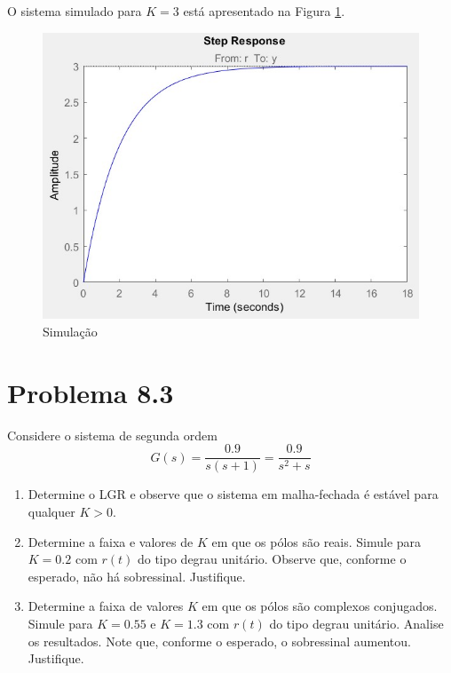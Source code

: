 \documentclass[
]{book}
\providecommand{\tightlist}{%
  \setlength{\itemsep}{0pt}\setlength{\parskip}{0pt}}
\theoremstyle{definition}
\theoremstyle{definition}
\theoremstyle{definition}
\theoremstyle{remark}
\begin{document}
O sistema simulado para \(K = 3\) está apresentado na Figura \ref{fig:fig82b2}.

\begin{figure}

{\centering \includegraphics{Imagens/Lab8/Resolução/fig2b2} 

}

\caption{Simulação}\label{fig:fig82b2}
\end{figure}

\hypertarget{problema-8.3}{%
\section*{Problema 8.3}\label{problema-8.3}}

Considere o sistema de segunda ordem
\[
G(s) = \frac{0.9}{s(s+1)} = \frac{0.9}{s^2+s}
\]

\begin{enumerate}
\def\labelenumi{\alph{enumi}.}
\tightlist
\item
  Determine o LGR e observe que o sistema em malha-fechada é estável para qualquer \(K>0\).
\item
  Determine a faixa e valores de \(K\) em que os pólos são reais. Simule para \(K=0.2\) com \(r(t)\) do tipo degrau unitário. Observe que, conforme o esperado, não há sobressinal. Justifique.
\item
  Determine a faixa de valores \(K\) em que os pólos são complexos conjugados. Simule para \(K = 0.55\) e \(K = 1.3\) com \(r(t)\) do tipo degrau unitário. Analise os resultados. Note que, conforme o esperado, o sobressinal aumentou. Justifique.
\end{enumerate}
\end{document}
